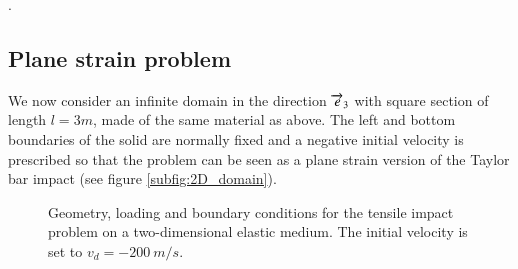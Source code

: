 .


\subsection{Plane strain problem}
\label{sec:plane-strain-problem}
We now consider an infinite domain in the direction ${\overrightarrow{e}}_3$ with square section of length $l=3m$, made of the same material as above.
The left and bottom boundaries of the solid are normally fixed and a negative initial velocity is prescribed so that the problem can be seen as a plane strain version of the Taylor bar impact (see figure \ref{subfig:2D_domain}).
\begin{figure}[ht]
  \centering
   \qquad
  \caption{Geometry, loading and boundary conditions for the tensile impact problem on a two-dimensional elastic medium. The initial velocity is set to $v_d=-200 \: m/s$.}
  \label{fig:PS_domain}
\end{figure}



